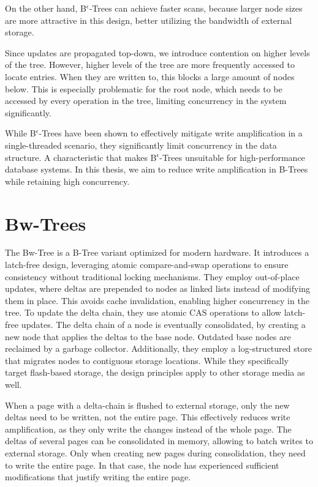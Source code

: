 On the other hand, B$^\epsilon$-Trees can achieve faster scans, because larger node sizes are more attractive in this design, better utilizing the bandwidth of external storage.

Since updates are propagated top-down, we introduce contention on higher levels of the tree.
However, higher levels of the tree are more frequently accessed to locate entries.
When they are written to, this blocks a large amount of nodes below.
This is especially problematic for the root node, which needs to be accessed by every operation in the tree, limiting concurrency in the system significantly.

While B$^\epsilon$-Trees have been shown to effectively mitigate write amplification in a single-threaded scenario, they significantly limit concurrency in the data structure.
A characteristic that makes B$^\epsilon$-Trees unsuitable for high-performance database systems.
In this thesis, we aim to reduce write amplification in B-Trees while retaining high concurrency.


\section{Bw-Trees}
The Bw-Tree \cite{levandoski2013bw} is a B-Tree variant optimized for modern hardware.
It introduces a latch-free design, leveraging atomic compare-and-swap operations to ensure consistency without traditional locking mechanisms.
They employ out-of-place updates, where deltas are prepended to nodes as linked lists instead of modifying them in place.
This avoids cache invalidation, enabling higher concurrency in the tree.
To update the delta chain, they use atomic \ac{CAS} operations to allow latch-free updates.
The delta chain of a node is eventually consolidated, by creating a new node that applies the deltas to the base node.
Outdated base nodes are reclaimed by a garbage collector.
Additionally, they employ a log-structured store that migrates nodes to contiguous storage locations.
While they specifically target flash-based storage, the design principles apply to other storage media as well.

When a page with a delta-chain is flushed to external storage, only the new deltas need to be written, not the entire page.
This effectively reduces write amplification, as they only write the changes instead of the whole page.
The deltas of several pages can be consolidated in memory, allowing to batch writes to external storage.
Only when creating new pages during consolidation, they need to write the entire page.
In that case, the node has experienced sufficient modifications that justify writing the entire page.

